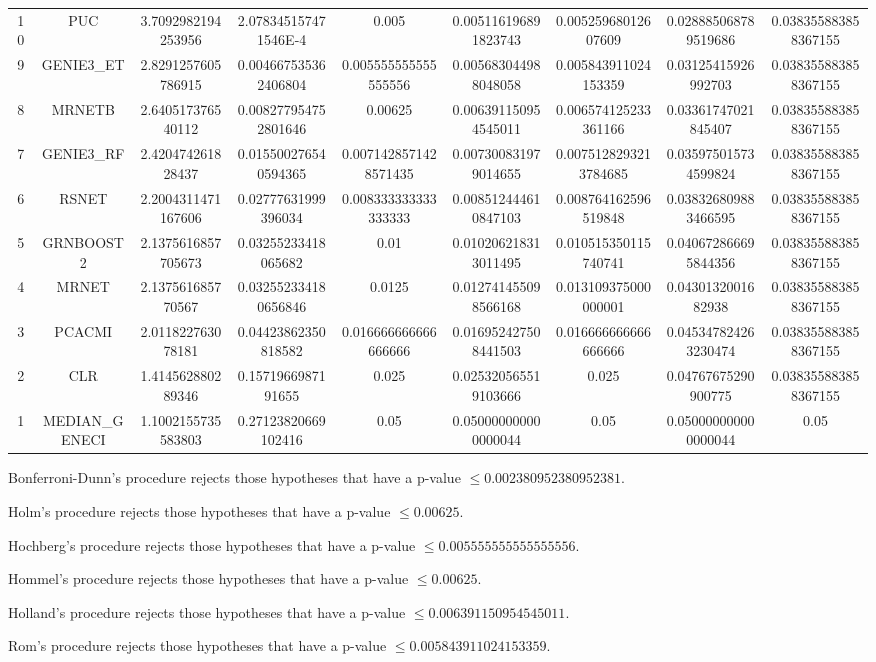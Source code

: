 \documentclass[a4paper,10pt]{article}
\begin{document}
\begin{landscape}
\begin{table}[!htp]
\begin{tabular}{ccccccccc}
10&PUC&3.7092982194253956&2.078345157471546E-4&0.005&0.005116196891823743&0.00525968012607609&0.028885068789519686&0.038355883858367155\\
9&GENIE3_ET&2.8291257605786915&0.004667535362406804&0.005555555555555556&0.005683044988048058&0.005843911024153359&0.03125415926992703&0.038355883858367155\\
8&MRNETB&2.640517376540112&0.008277954752801646&0.00625&0.006391150954545011&0.006574125233361166&0.03361747021845407&0.038355883858367155\\
7&GENIE3_RF&2.420474261828437&0.015500276540594365&0.0071428571428571435&0.007300831979014655&0.0075128293213784685&0.035975015734599824&0.038355883858367155\\
6&RSNET&2.2004311471167606&0.02777631999396034&0.008333333333333333&0.008512444610847103&0.008764162596519848&0.038326809883466595&0.038355883858367155\\
5&GRNBOOST2&2.1375616857705673&0.03255233418065682&0.01&0.010206218313011495&0.010515350115740741&0.040672866695844356&0.038355883858367155\\
4&MRNET&2.137561685770567&0.032552334180656846&0.0125&0.012741455098566168&0.013109375000000001&0.0430132001682938&0.038355883858367155\\
3&PCACMI&2.011822763078181&0.04423862350818582&0.016666666666666666&0.016952427508441503&0.016666666666666666&0.045347824263230474&0.038355883858367155\\
2&CLR&1.414562880289346&0.1571966987191655&0.025&0.025320565519103666&0.025&0.04767675290900775&0.038355883858367155\\
1&MEDIAN_GENECI&1.1002155735583803&0.27123820669102416&0.05&0.050000000000000044&0.05&0.050000000000000044&0.05\\
\hline
\end{tabular}
\end{table}
Bonferroni-Dunn's procedure rejects those hypotheses that have a p-value $\le0.002380952380952381$.


Holm's procedure rejects those hypotheses that have a p-value $\le0.00625$.


Hochberg's procedure rejects those hypotheses that have a p-value $\le0.005555555555555556$.


Hommel's procedure rejects those hypotheses that have a p-value $\le0.00625$.


Holland's procedure rejects those hypotheses that have a p-value $\le0.006391150954545011$.


Rom's procedure rejects those hypotheses that have a p-value $\le0.005843911024153359$.



\end{landscape}
\end{document}
